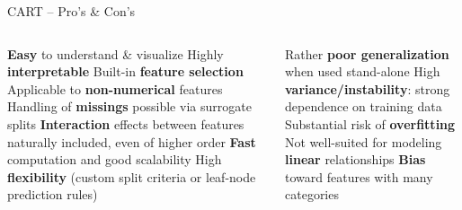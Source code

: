 
\begin{frame}{CART -- Pro's \& Con's}

\begin{columns}[onlytextwidth]
  \begin{column}{0.5\textwidth}
    \footnotesize
    \begin{itemize}
      \positem \textbf{Easy} to understand \& visualize
      \positem Highly \textbf{interpretable}
      \positem Built-in \textbf{feature selection}
      \positem Applicable to \textbf{non-numerical} features
      \positem Handling of \textbf{missings} possible via surrogate splits
      \positem \textbf{Interaction} effects between features naturally included, 
      even of higher order
      \positem \textbf{Fast} computation and good scalability
      \positem High \textbf{flexibility} (custom split criteria or leaf-node 
      prediction rules)   
    \end{itemize}
  \end{column}
  \begin{column}{0.5\textwidth}
    \footnotesize
    \begin{itemize}
      \negitem Rather \textbf{poor generalization} when used stand-alone 
      \negitem High \textbf{variance/instability}: strong dependence on training 
      data
      \negitem Substantial risk of \textbf{overfitting}
      \negitem Not well-suited for modeling \textbf{linear} relationships
      \negitem \textbf{Bias} toward features with many categories
    \end{itemize}
  \end{column}
\end{columns}

\vfill

\small


\end{frame}


